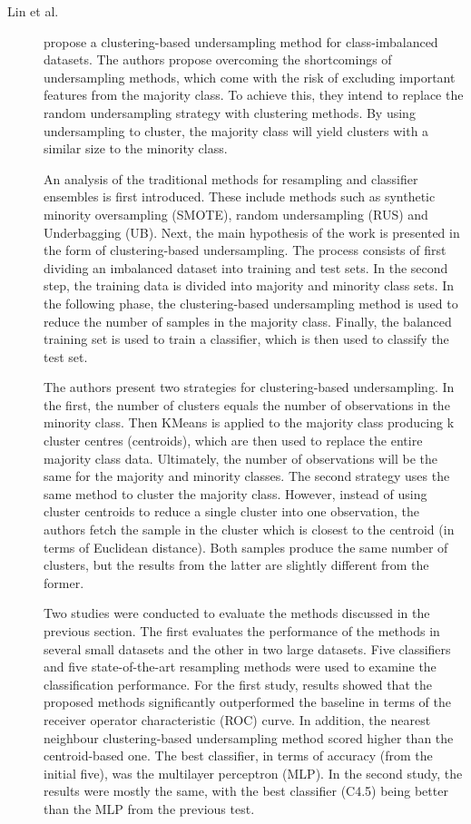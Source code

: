 \begin{description}
    \item[Lin et al.]\cite{Lin.Tsai.ea_Clusteringbasedundersamplingclassimbalanced_2017}  propose a clustering-based undersampling method for class-imbalanced datasets. The authors propose overcoming the shortcomings of undersampling methods, which come with the risk of excluding important features from the majority class. To achieve this, they intend to replace the random undersampling strategy with clustering methods. By using undersampling to cluster, the majority class will yield clusters with a similar size to the minority class. 
    
    An analysis of the traditional methods for resampling and classifier ensembles is first introduced. These include methods such as synthetic minority oversampling (SMOTE), random undersampling (RUS) and Underbagging (UB). Next, the main hypothesis of the work is presented in the form of clustering-based undersampling. The process consists of first dividing an imbalanced dataset into training and test sets. In the second step, the training data is divided into majority and minority class sets. In the following phase, the clustering-based undersampling method is used to reduce the number of samples in the majority class. Finally, the balanced training set is used to train a classifier, which is then used to classify the test set. 

    The authors present two strategies for clustering-based undersampling. In the first, the number of clusters equals the number of observations in the minority class. Then KMeans is applied to the majority class producing k cluster centres (centroids), which are then used to replace the entire majority class data. Ultimately, the number of observations will be the same for the majority and minority classes. The second strategy uses the same method to cluster the majority class. However, instead of using cluster centroids to reduce a single cluster into one observation, the authors fetch the sample in the cluster which is closest to the centroid (in terms of Euclidean distance). Both samples produce the same number of clusters, but the results from the latter are slightly different from the former.

    Two studies were conducted to evaluate the methods discussed in the previous section. The first evaluates the performance of the methods in several small datasets and the other in two large datasets. Five classifiers and five state-of-the-art resampling methods were used to examine the classification performance. For the first study, results showed that the proposed methods significantly outperformed the baseline in terms of the receiver operator characteristic (ROC) curve. In addition, the nearest neighbour clustering-based undersampling method scored higher than the centroid-based one. The best classifier, in terms of accuracy (from the initial five), was the multilayer perceptron (MLP). In the second study, the results were mostly the same, with the best classifier (C4.5) being better than the MLP from the previous test.


\end{description}
